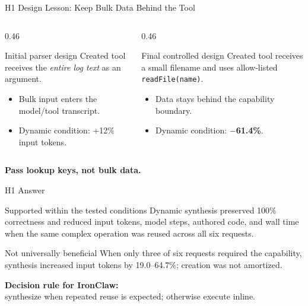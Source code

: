 \documentclass[aspectratio=169,11pt]{beamer}
\begin{document}
\begin{frame}{H1 Design Lesson: Keep Bulk Data Behind the Tool}
  \footnotesize
  \begin{columns}[T,totalwidth=\textwidth]
    \begin{column}{0.46\textwidth}
      \begin{alertblock}{Initial parser design}
        Created tool receives the \emph{entire log text} as an argument.
        \begin{itemize}
          \item Bulk input enters the model/tool transcript.
          \item Dynamic condition: \alert{+12\% input tokens}.
        \end{itemize}
      \end{alertblock}
    \end{column}
    \begin{column}{0.46\textwidth}
      \begin{exampleblock}{Final controlled design}
        Created tool receives a small filename and uses allow-listed
        \texttt{readFile(name)}.
        \begin{itemize}
          \item Data stays behind the capability boundary.
          \item Dynamic condition: \textbf{$-$61.4\%}.
        \end{itemize}
      \end{exampleblock}
    \end{column}
  \end{columns}
  \vspace{0.3cm}
  \centering
  \Large\textbf{Pass lookup keys, not bulk data.}
\end{frame}

\begin{frame}{H1 Answer}
  \begin{exampleblock}{Supported within the tested conditions}
    Dynamic synthesis preserved 100\% correctness and reduced input tokens,
    model steps, authored code, and wall time when the same complex operation
    was reused across all six requests.
  \end{exampleblock}
  \vspace{0.25cm}
  \begin{alertblock}{Not universally beneficial}
    When only three of six requests required the capability, synthesis increased
    input tokens by 19.0--64.7\%; creation was not amortized.
  \end{alertblock}
  \vspace{0.3cm}
  \centering
  \textbf{Decision rule for IronClaw:}\\
  synthesize when repeated reuse is expected; otherwise execute inline.
\end{frame}
\end{document}
